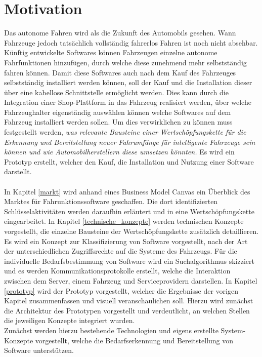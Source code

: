 \setcounter{page}{1}
\section{Motivation}
Das autonome Fahren wird als die Zukunft des Automobils gesehen. Wann Fahrzeuge jedoch tatsächlich vollständig fahrerlos Fahren ist noch nicht absehbar. Künftig entwickelte Softwares können Fahrzeugen einzelne autonome Fahrfunktionen hinzufügen, durch welche diese zunehmend mehr selbstständig fahren können. Damit diese Softwares auch nach dem Kauf des Fahrzeuges selbstständig installiert werden können, soll der Kauf und die Installation dieser über eine kabellose Schnittstelle ermöglicht werden. Dies kann durch die Integration einer Shop-Plattform in das Fahrzeug realisiert werden, über welche Fahrzeughalter eigenständig auswählen können welche Softwares auf dem Fahrzeug installiert werden sollen. Um dies verwirklichen zu können muss festgestellt werden, \textit{was relevante Bausteine einer Wertschöpfungskette für die Erkennung und Bereitstellung neuer Fahrumfänge für intelligente Fahrzeuge sein können und wie Automobilherstellern diese umsetzen könnten.} Es wird ein Prototyp erstellt, welcher den Kauf, die Installation und Nutzung einer Software darstellt.\\\\ 
In Kapitel \ref{markt} wird anhand eines Business Model Canvas ein Überblick des Marktes für Fahrunktionssoftware geschaffen. Die dort identifizierten Schlüsselaktivitäten werden daraufhin erläutert und in eine Wertschöpfungskette eingearbeitet. In Kapitel \ref{technische_konzepte} werden technischen Konzepte vorgestellt, die einzelne Bausteine der Wertschöpfungskette zusätzlich detaillieren. Es wird ein Konzept zur Klassifizierung von Software vorgestellt, nach der Art der unterschiedlichen Zugriffsrechte auf die Systeme des Fahrzeugs. Für die individuelle Bedarfsbestimmung von Software wird ein Suchalgorithmus skizziert und es werden Kommunikationsprotokolle erstellt, welche die Interaktion zwischen dem Server, einem Fahrzeug und Serviceprovidern darstellen. In Kapitel \ref{prototyp} wird der Prototyp vorgestellt, welcher die Ergebnisse der vorigen Kapitel zusammenfassen und visuell veranschaulichen soll. Hierzu wird zunächst die Architektur des Prototypen vorgestellt und verdeutlicht, an welchen Stellen die jeweiligen Konzepte integriert wurden.\\
Zunächst werden hierzu bestehende Technologien und eigens erstellte System-Konzepte vorgestellt, welche die Bedarfserkennung und Bereitstellung von Software unterstützen. 